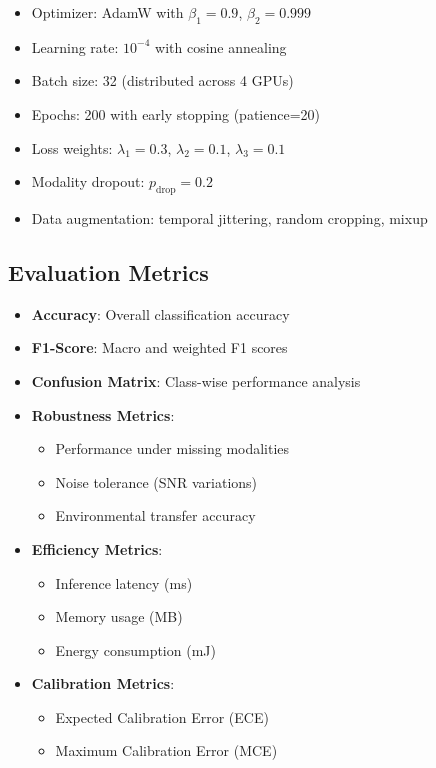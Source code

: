\documentclass[journal]{IEEEtran}
\begin{document}
\begin{itemize}
\item Optimizer: AdamW with $\beta_1=0.9$, $\beta_2=0.999$
\item Learning rate: $10^{-4}$ with cosine annealing
\item Batch size: 32 (distributed across 4 GPUs)
\item Epochs: 200 with early stopping (patience=20)
\item Loss weights: $\lambda_1=0.3$, $\lambda_2=0.1$, $\lambda_3=0.1$
\item Modality dropout: $p_{\text{drop}}=0.2$
\item Data augmentation: temporal jittering, random cropping, mixup
\end{itemize}

\subsection{Evaluation Metrics}

\begin{itemize}
\item \textbf{Accuracy}: Overall classification accuracy
\item \textbf{F1-Score}: Macro and weighted F1 scores
\item \textbf{Confusion Matrix}: Class-wise performance analysis
\item \textbf{Robustness Metrics}:
  \begin{itemize}
  \item Performance under missing modalities
  \item Noise tolerance (SNR variations)
  \item Environmental transfer accuracy
  \end{itemize}
\item \textbf{Efficiency Metrics}:
  \begin{itemize}
  \item Inference latency (ms)
  \item Memory usage (MB)
  \item Energy consumption (mJ)
  \end{itemize}
\item \textbf{Calibration Metrics}:
  \begin{itemize}
  \item Expected Calibration Error (ECE)
  \item Maximum Calibration Error (MCE)
  \end{itemize}
\end{itemize}
\end{document}
